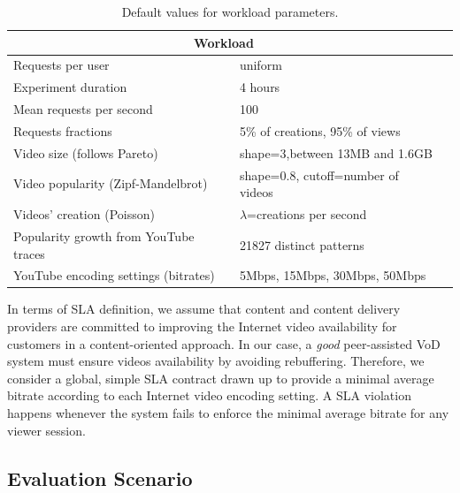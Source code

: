 \begin{table}
  \label{tab:workload_default_parameters}
	\begin{center}
		\caption{Default values for workload parameters.}
  		\label{tab:workload_parameters}
		\begin{tabular}{|p{6cm}|p{6cm}|l|}
			\hline
			\multicolumn{2}{|c|}{Workload} \\
			\hline
			\hline
			Requests per user&uniform\\
			\hline
			Experiment duration&4 hours\\
			\hline
			Mean requests per second&100\\
			\hline
			Requests fractions&5\% of creations, 95\% of views\\
			\hline
			Video size (follows Pareto)&shape=3,between 13MB and 1.6GB\\%
			\hline
			Video popularity (Zipf-Mandelbrot)&shape=0.8, cutoff=number of videos\\
			\hline
			Videos{'} creation (Poisson)&$\lambda$=creations per second\\
			\hline
			Popularity growth from YouTube traces&21827 distinct patterns\\
			\hline
			YouTube encoding settings (bitrates)&5Mbps, 15Mbps, 30Mbps, 50Mbps\\
			\hline
		\end{tabular}
	\end{center}
\end{table}

In terms of SLA definition, we assume that content and content delivery providers are committed to improving the Internet video availability for customers in a content-oriented approach. In our case, a \emph{good} peer-assisted VoD system must ensure videos availability by avoiding rebuffering. Therefore, we consider a global, simple SLA contract drawn up to provide a minimal average bitrate according to each Internet video encoding setting. A SLA violation happens whenever the system fails to enforce the minimal average bitrate for any viewer session. 


\subsection{Evaluation Scenario}
\label{subsec:methodology_evaluation_scenario}

